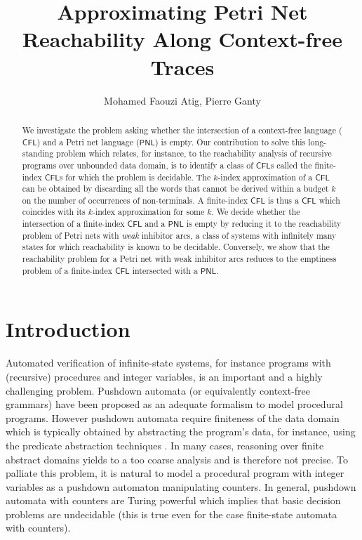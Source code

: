 \documentclass{fsttcs}
\def\cfl{\mathsf{CFL}}
\def\pnl{\mathsf{PNL}}
\begin{document}
\title{Approximating Petri Net Reachability Along Context-free Traces}

\author{Mohamed Faouzi Atig, Pierre Ganty}






\begin{abstract}
We investigate the problem asking whether the intersection of a
context-free language (\(\cfl\)) and a Petri net language (\(\pnl\)) is empty.
Our contribution to solve this long-standing problem which relates, for
instance, to the reachability analysis of recursive programs over unbounded
data domain, is to identify a class of \(\cfl\)s called the finite-index
\(\cfl\)s for which the problem is decidable.  The \(k\)-index approximation of
a \(\cfl\)  can be obtained by discarding all the words that cannot be derived
within a budget \(k\) on the number of occurrences of non-terminals.  A
finite-index \(\cfl\) is thus a \(\cfl\) which coincides with its \(k\)-index
approximation for some \(k\). We decide whether the intersection of a finite-index \(\cfl\) and a \(\pnl\) is empty by reducing it to the reachability
problem of Petri nets with {\em weak} inhibitor arcs, a class of
systems with infinitely many states for which reachability is known to be
decidable.  Conversely, we show that the reachability problem for a Petri net
with weak inhibitor arcs reduces to the emptiness problem of a finite-index
\(\cfl\) intersected with a \(\pnl\).
\end{abstract}

\section{Introduction}



Automated verification of infinite-state systems, for instance programs with
(recursive) procedures and integer variables, is an important and a highly
challenging problem.  Pushdown automata (or equivalently context-free grammars) have been
proposed as an adequate formalism to model procedural programs. However
pushdown automata require finiteness of the data domain which is typically
obtained by abstracting the program's data, for instance, using the predicate
abstraction techniques \cite{Cousot77-POPL,GS97}.  In many cases, reasoning
over finite abstract domains yields to a too coarse analysis and is therefore
not precise. To palliate this problem, it is natural to model a procedural
program with integer variables as a pushdown automaton manipulating counters.
In general, pushdown automata with counters are Turing powerful 
which implies that basic decision problems are undecidable (this is true even
for the case finite-state automata with counters).  
\end{document}
